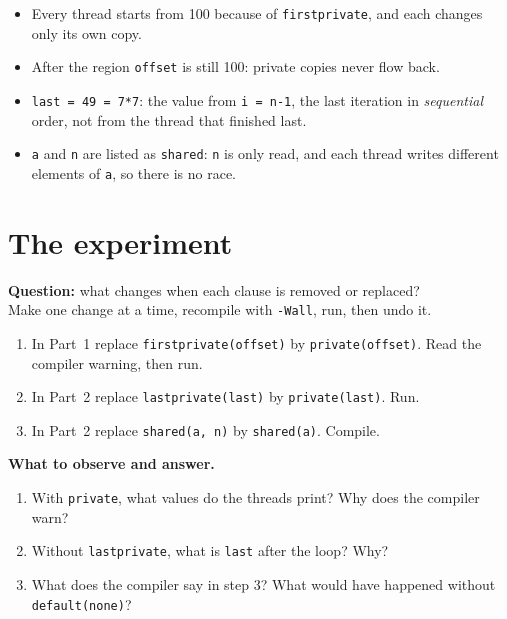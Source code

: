 \documentclass[11pt,a4paper]{article}
\begin{document}
\begin{keyidea}
\begin{itemize}
  \item Every thread starts from 100 because of \texttt{firstprivate}, and each changes
        only its own copy.
  \item After the region \texttt{offset} is still 100: private copies never flow back.
  \item \texttt{last = 49 = 7*7}: the value from \texttt{i = n-1}, the last iteration in
        \emph{sequential} order, not from the thread that finished last.
  \item \texttt{a} and \texttt{n} are listed as \texttt{shared}: \texttt{n} is only read,
        and each thread writes different elements of \texttt{a}, so there is no race.
\end{itemize}
\end{keyidea}

\section{The experiment}
\begin{experiment}
\textbf{Question:} what changes when each clause is removed or replaced?\\
Make one change at a time, recompile with \texttt{-Wall}, run, then undo it.
\begin{enumerate}
  \item In Part~1 replace \texttt{firstprivate(offset)} by \texttt{private(offset)}.
        Read the compiler warning, then run.
  \item In Part~2 replace \texttt{lastprivate(last)} by \texttt{private(last)}. Run.
  \item In Part~2 replace \texttt{shared(a, n)} by \texttt{shared(a)}. Compile.
\end{enumerate}
\textbf{What to observe and answer.}
\begin{enumerate}
  \item With \texttt{private}, what values do the threads print? Why does the compiler warn?
  \item Without \texttt{lastprivate}, what is \texttt{last} after the loop? Why?
  \item What does the compiler say in step 3? What would have happened without
        \texttt{default(none)}?
\end{enumerate}
\end{experiment}
\end{document}
